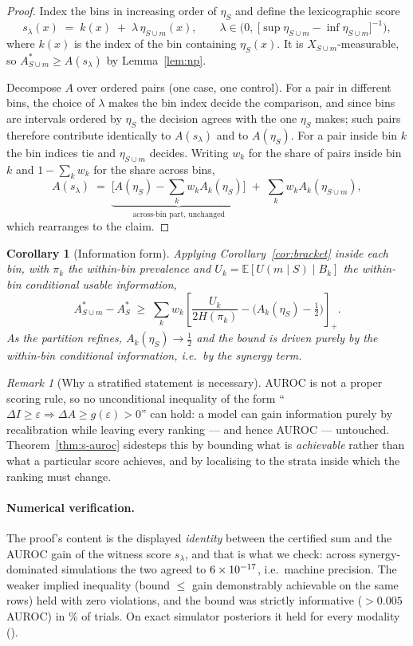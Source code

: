 \documentclass[11pt]{article}
\newtheorem{corollary}{Corollary}
\theoremstyle{definition}
\theoremstyle{remark}
\newtheorem{remark}{Remark}
\newcommand{\E}{\mathbb{E}}
\begin{document}
\begin{proof}
Index the bins in increasing order of $\eta_S$ and define the lexicographic score
\[
s_\lambda(x) \;=\; k(x) \;+\; \lambda\,\eta_{S\cup m}(x),
\qquad \lambda \in \Big(0,\ \big[\sup \eta_{S\cup m}-\inf \eta_{S\cup m}\big]^{-1}\Big),
\]
where $k(x)$ is the index of the bin containing $\eta_S(x)$. It is
$X_{S\cup m}$-measurable, so $A^*_{S\cup m}\ge A(s_\lambda)$ by
Lemma~\ref{lem:np}.

Decompose $A$ over ordered pairs (one case, one control). For a pair in
different bins, the choice of $\lambda$ makes the bin index decide the
comparison, and since bins are intervals ordered by $\eta_S$ the decision agrees
with the one $\eta_S$ makes; such pairs therefore contribute identically to
$A(s_\lambda)$ and to $A(\eta_S)$. For a pair inside bin $k$ the bin indices tie
and $\eta_{S\cup m}$ decides. Writing $w_k$ for the share of pairs inside bin $k$
and $1-\sum_k w_k$ for the share across bins,
\[
A(s_\lambda) \;=\; \underbrace{\Big[A(\eta_S)-\sum_k w_k A_k(\eta_S)\Big]}_{\text{across-bin part, unchanged}}
\;+\;\sum_k w_k A_k(\eta_{S\cup m}),
\]
which rearranges to the claim.
\end{proof}

\begin{corollary}[Information form]
\label{cor:thm1-info}
Applying Corollary~\ref{cor:bracket} inside each bin, with $\pi_k$ the within-bin
prevalence and $U_k=\E[U(m\mid S)\mid B_k]$ the within-bin conditional usable
information,
\[
A^*_{S\cup m}-A^*_S \;\ge\; \sum_k w_k\left[\frac{U_k}{2H(\pi_k)}-\big(A_k(\eta_S)-\tfrac12\big)\right]_+ .
\]
As the partition refines, $A_k(\eta_S)\to\tfrac12$ and the bound is driven purely
by the within-bin conditional information, i.e.\ by the synergy term.
\end{corollary}

\begin{remark}[Why a stratified statement is necessary]
AUROC is not a proper scoring rule, so no unconditional inequality of the form
``$\Delta I\ge\varepsilon \Rightarrow \Delta A \ge g(\varepsilon)>0$'' can hold:
a model can gain information purely by recalibration while leaving every ranking
--- and hence AUROC --- untouched. Theorem~\ref{thm:s-auroc} sidesteps this by
bounding what is \emph{achievable} rather than what a particular score achieves,
and by localising to the strata inside which the ranking must change.
\end{remark}

\paragraph{Numerical verification.} The proof's content is the displayed
\emph{identity} between the certified sum and the AUROC gain of the witness
score $s_\lambda$, and that is what we check: across synergy-dominated
simulations the two agreed to $6\times10^{-17}$, i.e.\ machine precision. The
weaker implied inequality (bound $\le$ gain demonstrably achievable on the same
rows) held with zero violations, and the bound was strictly informative
($>0.005$ AUROC) in \thyThmOneInformative\% of trials. On exact simulator posteriors it held
for every modality (\simThmOneHolds).
\end{document}
